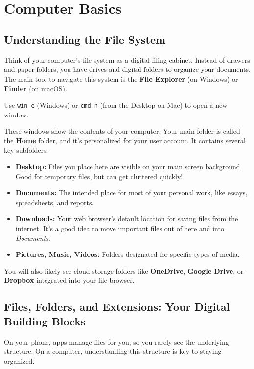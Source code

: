 \documentclass[11pt,a4paper]{report}
\begin{document}
\section{Computer Basics}

\subsection{Understanding the File System}

Think of your computer's file system as a digital filing cabinet. Instead of drawers and paper folders, you have drives and digital folders to organize your documents. The main tool to navigate this system is the \textbf{File Explorer} (on Windows) or \textbf{Finder} (on macOS).

Use \verb|win-e| (Windows) or \verb|cmd-n| (from the Desktop on Mac) to open a new window.


These windows show the contents of your computer.
Your main folder is called the \textbf{Home} folder, and it's personalized for your user account. It contains several key subfolders:

\begin{itemize}
    \item \textbf{Desktop:} Files you place here are visible on your main screen background. Good for temporary files, but can get cluttered quickly!
    \item \textbf{Documents:} The intended place for most of your personal work, like essays, spreadsheets, and reports.
    \item \textbf{Downloads:} Your web browser's default location for saving files from the internet. It's a good idea to move important files out of here and into \emph{Documents}.
    \item \textbf{Pictures, Music, Videos:} Folders designated for specific types of media.
\end{itemize}

You will also likely see cloud storage folders like \textbf{OneDrive}, \textbf{Google Drive}, or \textbf{Dropbox} integrated into your file browser.


\subsection{Files, Folders, and Extensions: Your Digital Building Blocks}

On your phone, apps manage files for you, so you rarely see the underlying structure. On a computer, understanding this structure is key to staying organized.
\end{document}
